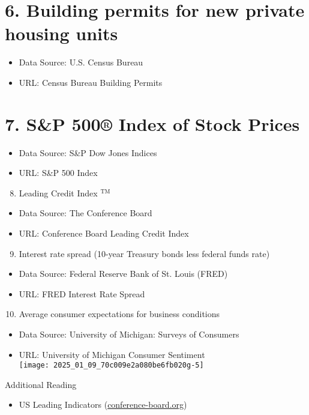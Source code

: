 \documentclass[10pt]{article}
\begin{document}
\section*{6. Building permits for new private housing units}
\begin{itemize}
  \item Data Source: U.S. Census Bureau
  \item URL: Census Bureau Building Permits
\end{itemize}

\section*{7. S\&P 500® Index of Stock Prices}
\begin{itemize}
  \item Data Source: S\&P Dow Jones Indices
  \item URL: S\&P 500 Index
\end{itemize}

\begin{enumerate}
  \setcounter{enumi}{7}
  \item Leading Credit Index ${ }^{\text {TM }}$
\end{enumerate}

\begin{itemize}
  \item Data Source: The Conference Board
  \item URL: Conference Board Leading Credit Index
\end{itemize}

\begin{enumerate}
  \setcounter{enumi}{8}
  \item Interest rate spread (10-year Treasury bonds less federal funds rate)
\end{enumerate}

\begin{itemize}
  \item Data Source: Federal Reserve Bank of St. Louis (FRED)
  \item URL: FRED Interest Rate Spread
\end{itemize}

\begin{enumerate}
  \setcounter{enumi}{9}
  \item Average consumer expectations for business conditions
\end{enumerate}

\begin{itemize}
  \item Data Source: University of Michigan: Surveys of Consumers
  \item URL: University of Michigan Consumer Sentiment\\
\texttt{[image: 2025\_01\_09\_70c009e2a080be6fb020g-5]}
\end{itemize}

Additional Reading

\begin{itemize}
  \item US Leading Indicators (\href{http://conference-board.org}{conference-board.org})
\end{itemize}
\end{document}
